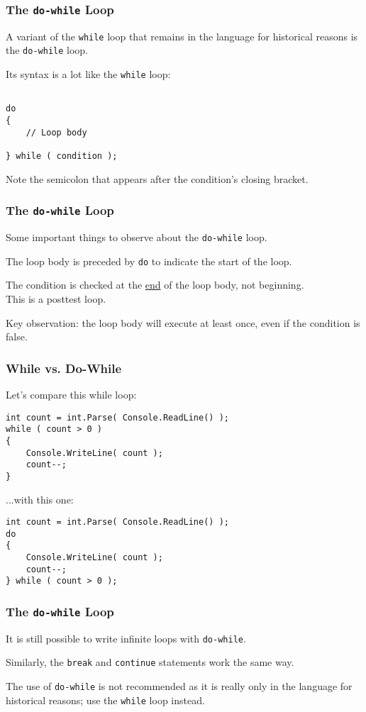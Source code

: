 \begin{frame}[fragile]
\frametitle{The \texttt{do-while} Loop}
A variant of the \texttt{while} loop that remains in the language for historical reasons is the \texttt{do-while} loop.

Its syntax is a lot like the \texttt{while} loop:

\begin{verbatim}

do 
{
    // Loop body

} while ( condition );

\end{verbatim}

Note the semicolon that appears after the condition's closing bracket.

\end{frame}

\begin{frame}
\frametitle{The \texttt{do-while} Loop}

Some important things to observe about the \texttt{do-while} loop.

The loop body is preceded by \texttt{do} to indicate the start of the loop.

The condition is checked at the \underline{end} of the loop body, not beginning.\\
\quad This is a posttest loop.

Key observation: the loop body will execute at least once, even if the condition is false.

\end{frame}

\begin{frame}[fragile]
\frametitle{While vs. Do-While}

Let's compare this while loop:

\begin{verbatim}
int count = int.Parse( Console.ReadLine() );
while ( count > 0 ) 
{
    Console.WriteLine( count );
    count--;
}
\end{verbatim}

...with this one:

\begin{verbatim}
int count = int.Parse( Console.ReadLine() );
do 
{
    Console.WriteLine( count );
    count--;
} while ( count > 0 );
\end{verbatim}


\end{frame}

\begin{frame}
\frametitle{The \texttt{do-while} Loop}

It is still possible to write infinite loops with \texttt{do-while}.

Similarly, the \texttt{break} and \texttt{continue} statements work the same way.

The use of \texttt{do-while} is not recommended as it is really only in the language for historical reasons; use the \texttt{while} loop instead.

\end{frame}



